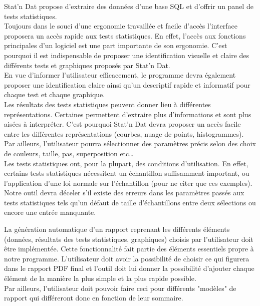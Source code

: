 \documentclass[a4paper,10pt]{report}
\begin{document}
Stat’n Dat propose d’extraire des données d’une base SQL et d’offrir un panel de tests statistiques. \\
Toujours dans le souci d’une ergonomie travaillée et facile d’accès l’interface proposera un accès rapide aux tests statistiques. En effet, l’accès aux fonctions principales d’un logiciel est une part importante de son ergonomie. C’est pourquoi il est indispensable de proposer une identification visuelle et claire des différents tests et graphiques proposés par Stat’n Dat.\\

En vue d’informer l’utilisateur efficacement, le programme devra également proposer une identification claire ainsi qu’un descriptif rapide et informatif pour chaque test et chaque graphique.\\

Les résultats des tests statistiques peuvent donner lieu à différentes représentations. Certaines permettent d’extraire plus d’informations et sont plus aisées à interpréter. C’est pourquoi Stat’n Dat devra proposer un accès facile entre les différentes représentations (courbes, nuage de points, histogrammes). Par ailleurs, l’utilisateur pourra sélectionner des paramètres précis selon des choix de couleurs, taille, pas, superposition etc… \\

Les tests statistiques ont, pour la plupart, des conditions d’utilisation. En effet, certains tests statistiques nécessitent un échantillon suffisamment important, ou l’application d’une loi normale sur l’échantillon (pour ne citer que ces exemples). Notre outil devra déceler s’il existe des erreurs dans les paramètres passés aux tests statistiques tels qu’un défaut de taille d’échantillons entre deux sélections ou encore une entrée manquante.

La génération automatique d'un rapport reprenant les différents éléments (données, résultats des tests statistiques, graphiques) choisis par l'utilisateur doit être implémentée. Cette fonctionnalité fait partie des éléments essentiels propre à notre programme. L'utilisateur doit avoir la possibilité de choisir ce qui figurera dans le rapport PDF final et l'outil doit lui donner la possibilité d'ajouter chaque élément de la manière la plus simple et la plus rapide possible. \\
Par ailleurs, l'utilisateur doit pouvoir faire ceci pour différents "modèles" de rapport qui différeront donc en fonction de leur sommaire.\\
\end{document}
